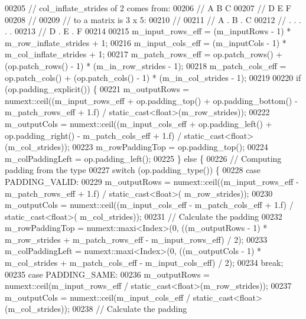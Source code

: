 \begin{DoxyCode}
00205     \textcolor{comment}{// col\_inflate\_strides of 2 comes from:}
00206     \textcolor{comment}{//   A B C}
00207     \textcolor{comment}{//   D E F}
00208     \textcolor{comment}{//}
00209     \textcolor{comment}{// to a matrix is 3 x 5:}
00210     \textcolor{comment}{//}
00211     \textcolor{comment}{//   A . B . C}
00212     \textcolor{comment}{//   . . . . .}
00213     \textcolor{comment}{//   D . E . F}
00214 
00215     m\_input\_rows\_eff = (m\_inputRows - 1) * m\_row\_inflate\_strides + 1;
00216     m\_input\_cols\_eff = (m\_inputCols - 1) * m\_col\_inflate\_strides + 1;
00217     m\_patch\_rows\_eff = op.patch\_rows() + (op.patch\_rows() - 1) * (m\_in\_row\_strides - 1);
00218     m\_patch\_cols\_eff = op.patch\_cols() + (op.patch\_cols() - 1) * (m\_in\_col\_strides - 1);
00219 
00220     \textcolor{keywordflow}{if} (op.padding\_explicit()) \{
00221       m\_outputRows = numext::ceil((m\_input\_rows\_eff + op.padding\_top() + op.padding\_bottom() - 
      m\_patch\_rows\_eff + 1.f) / static\_cast<float>(m\_row\_strides));
00222       m\_outputCols = numext::ceil((m\_input\_cols\_eff + op.padding\_left() + op.padding\_right() - 
      m\_patch\_cols\_eff + 1.f) / static\_cast<float>(m\_col\_strides));
00223       m\_rowPaddingTop = op.padding\_top();
00224       m\_colPaddingLeft = op.padding\_left();
00225     \} \textcolor{keywordflow}{else} \{
00226       \textcolor{comment}{// Computing padding from the type}
00227       \textcolor{keywordflow}{switch} (op.padding\_type()) \{
00228         \textcolor{keywordflow}{case} PADDING\_VALID:
00229           m\_outputRows = numext::ceil((m\_input\_rows\_eff - m\_patch\_rows\_eff + 1.f) / static\_cast<float>(
      m\_row\_strides));
00230           m\_outputCols = numext::ceil((m\_input\_cols\_eff - m\_patch\_cols\_eff + 1.f) / static\_cast<float>(
      m\_col\_strides));
00231           \textcolor{comment}{// Calculate the padding}
00232           m\_rowPaddingTop = numext::maxi<Index>(0, ((m\_outputRows - 1) * m\_row\_strides + m\_patch\_rows\_eff -
       m\_input\_rows\_eff) / 2);
00233           m\_colPaddingLeft = numext::maxi<Index>(0, ((m\_outputCols - 1) * m\_col\_strides + m\_patch\_cols\_eff 
      - m\_input\_cols\_eff) / 2);
00234           \textcolor{keywordflow}{break};
00235         \textcolor{keywordflow}{case} PADDING\_SAME:
00236           m\_outputRows = numext::ceil(m\_input\_rows\_eff / static\_cast<float>(m\_row\_strides));
00237           m\_outputCols = numext::ceil(m\_input\_cols\_eff / static\_cast<float>(m\_col\_strides));
00238           \textcolor{comment}{// Calculate the padding}

\end{DoxyCode}
